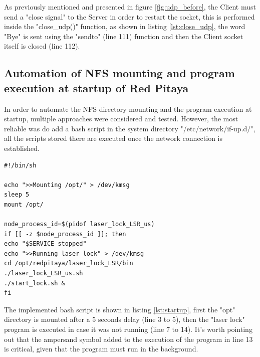 \documentclass[a4paper,12pt]{article}
\newlength{\gobble}
\begin{document}
 \vspace{0.4cm}

As previously mentioned and presented in figure \ref{fig:udp_before}, the Client must send a "close signal" to the Server in order to restart the socket, this is performed inside the "close\_udp()" function, as shown in listing \ref{lst:close_udp}, the word "Bye" is sent using the "sendto" (line 111) function and then the Client socket itself is closed (line 112).

 \vspace{0.4cm}


\subsection{Automation of NFS mounting and program execution at startup of Red Pitaya}
\label{section:start_up_automation}

In order to automate the NFS directory mounting and the program execution at startup, multiple approaches were considered and tested. However, the most reliable was do add a bash script in the system directory "/etc/network/if-up.d/", all the scripts stored there are executed once the network connection is established.

\pagebreak
\begin{lstlisting}[style=bash,label={lst:startup},caption={Automated NFS mounting and program execution script.}]
#!/bin/sh

echo ">>Mounting /opt/" > /dev/kmsg
sleep 5
mount /opt/

node_process_id=$(pidof laser_lock_LSR_us)
if [[ -z $node_process_id ]]; then
echo "$SERVICE stopped"
echo ">>Running laser lock" > /dev/kmsg
cd /opt/redpitaya/laser_lock_LSR/bin
./laser_lock_LSR_us.sh
./start_lock.sh &
fi
\end{lstlisting}

The implemented bash script is shown in listing \ref{lst:startup}, first the "\/opt" directory is mounted after a 5 seconds delay (line 3 to 5), then the "laser lock" program is executed in case it was not running (line 7 to 14). It's worth pointing out that the ampersand symbol added to the execution of the program in line 13 is critical, given that the program must run in the background.
\end{document}
